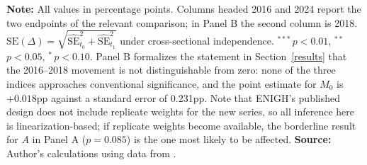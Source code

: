 \documentclass[11pt, a4paper]{article}
\begin{document}
\begin{table}[htb]
\begin{justify}
\scriptsize
\textbf{Note:} All values in percentage points. Columns headed 2016 and 2024 report the two endpoints of the relevant comparison; in Panel B the second column is 2018. $\mathrm{SE}(\Delta)=\sqrt{\widehat{\mathrm{SE}}_{t_0}^2+\widehat{\mathrm{SE}}_{t_1}^2}$ under cross-sectional independence. $^{***}$\,$p<0.01$, $^{**}$\,$p<0.05$, $^{*}$\,$p<0.10$. Panel B formalizes the statement in Section~\ref{results} that the 2016--2018 movement is not distinguishable from zero: none of the three indices approaches conventional significance, and the point estimate for $M_0$ is $+0.018$pp against a standard error of 0.231pp. Note that ENIGH's published design does not include replicate weights for the new series, so all inference here is linearization-based; if replicate weights become available, the borderline result for $A$ in Panel A ($p=0.085$) is the one most likely to be affected. \textbf{Source:} Author's calculations using data from \textcite{enigh2016, enigh2018, enigh2020, enigh2022, enigh2024}.
\end{justify}
\label{tab:delta}
\end{table}
\end{document}
